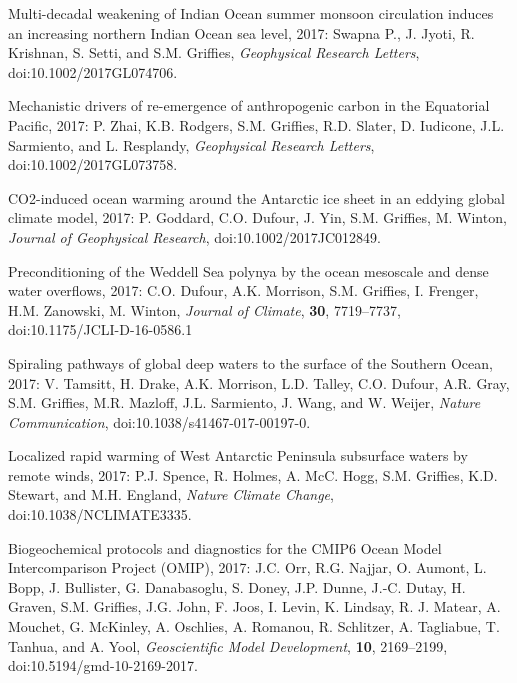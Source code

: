 \begin{etaremune}
\item Multi-decadal weakening of Indian Ocean summer monsoon circulation induces an increasing northern Indian Ocean sea level, 2017: Swapna P., J. Jyoti, R. Krishnan, S. Setti, and S.M. Grif\/f\/ies, {\it Geophysical Research  Letters}, \newline doi:10.1002/2017GL074706.



\item Mechanistic drivers of re-emergence of anthropogenic carbon in the Equatorial Pacific, 2017: P. Zhai, K.B. Rodgers, S.M. Grif\/fies, R.D. Slater, D. Iudicone, J.L. Sarmiento, and L. Resplandy, {\it Geophysical Research Letters}, doi:10.1002/2017GL073758.

\item CO2-induced ocean warming around the Antarctic ice sheet in an eddying global climate model, 2017: P. Goddard, C.O. Dufour, J. Yin, S.M. Grif\/f\/ies, M. Winton, {\it Journal of Geophysical Research}, doi:10.1002/2017JC012849. 

\item Preconditioning of the Weddell Sea polynya by the ocean mesoscale and dense water overflows, 2017: C.O. Dufour, A.K. Morrison, S.M. Grif\/f\/ies, I. Frenger, H.M. Zanowski, M. Winton, {\it Journal of Climate}, {\bf 30}, 7719--7737, doi:10.1175/JCLI-D-16-0586.1

\item Spiraling pathways of global deep waters to the surface of the Southern Ocean, 2017: V. Tamsitt, H.  Drake, A.K. Morrison, L.D. Talley, C.O. Dufour, A.R. Gray, S.M. Grif\/f\/ies, M.R. Mazloff, J.L. Sarmiento, J. Wang, and W. Weijer, {\it Nature Communication}, doi:10.1038/s41467-017-00197-0.

\item Localized rapid warming of West Antarctic Peninsula subsurface waters by remote winds, 2017: P.J. Spence, R. Holmes, A. McC. Hogg,   S.M. Grif\/f\/ies, K.D. Stewart, and M.H. England, {\it Nature Climate Change}, doi:10.1038/NCLIMATE3335.

\item Biogeochemical protocols and diagnostics for the CMIP6 Ocean Model Intercomparison Project (OMIP), 2017: J.C. Orr, R.G. Najjar, O. Aumont, L.  Bopp, J. Bullister, G. Danabasoglu, S. Doney,  J.P. Dunne, J.-C. Dutay, H. Graven, S.M. Grif\/f\/ies, J.G. John, F. Joos, I. Levin, K. Lindsay, R. J. Matear, A. Mouchet, G. McKinley, A. Oschlies, A. Romanou, R. Schlitzer, A. Tagliabue, T. Tanhua, and A. Yool, {\it Geoscientific Model Development}, {\bf 10}, 2169--2199, doi:10.5194/gmd-10-2169-2017.


\end{etaremune}
